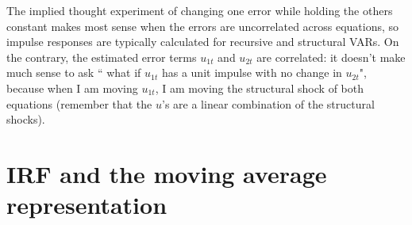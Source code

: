 \documentclass[11pt,a4paper]{report}
\numberwithin{equation}{chapter}
\numberwithin{section}{chapter}
\begin{document}
The implied thought experiment of changing one error while holding the
others constant makes most sense when the errors are uncorrelated across
equations, so impulse responses are typically calculated for recursive and
structural VARs. On the contrary, the estimated error terms $u_{1t}$ and $%
u_{2t}$ are correlated: it doesn't make much sense to ask \textquotedblleft
what if $u_{1t}$ has a unit impulse with no change in $u_{2t}$", because
when I am moving $u_{1t}$, I am moving the structural shock of both
equations (remember that the $u$'s are a linear combination of the
structural shocks).

\section{IRF and the moving average representation}
\end{document}
